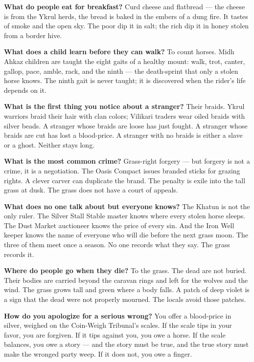 \vspace{1em}

\begin{almanac}
\textbf{What do people eat for breakfast?} Curd cheese and flatbread --- the cheese is from the Ykrul herds, the bread is baked in the embers of a dung fire. It tastes of smoke and the open sky. The poor dip it in salt; the rich dip it in honey stolen from a border hive.

\textbf{What does a child learn before they can walk?} To count horses. Midh Ahkaz children are taught the eight gaits of a healthy mount: walk, trot, canter, gallop, pace, amble, rack, and the ninth --- the death-sprint that only a stolen horse knows. The ninth gait is never taught; it is discovered when the rider's life depends on it.

\textbf{What is the first thing you notice about a stranger?} Their braids. Ykrul warriors braid their hair with clan colors; Vilikari traders wear oiled braids with silver beads. A stranger whose braids are loose has just fought. A stranger whose braids are cut has lost a blood-price. A stranger with no braids is either a slave or a ghost. Neither stays long.

\textbf{What is the most common crime?} Grass-right forgery --- but forgery is not a crime, it is a negotiation. The Oasis Compact issues branded sticks for grazing rights. A clever carver can duplicate the brand. The penalty is exile into the tall grass at dusk. The grass does not have a court of appeals.

\textbf{What does no one talk about but everyone knows?} The Khatun is not the only ruler. The Silver Stall Stable master knows where every stolen horse sleeps. The Dust Market auctioneer knows the price of every sin. And the Iron Well keeper knows the name of everyone who will die before the next grass moon. The three of them meet once a season. No one records what they say. The grass records it.

\textbf{Where do people go when they die?} To the grass. The dead are not buried. Their bodies are carried beyond the caravan rings and left for the wolves and the wind. The grass grows tall and green where a body falls. A patch of deep violet is a sign that the dead were not properly mourned. The locals avoid those patches.

\textbf{How do you apologize for a serious wrong?} You offer a blood-price in silver, weighed on the Coin-Weigh Tribunal's scales. If the scale tips in your favor, you are forgiven. If it tips against you, you owe a horse. If the scale balances, you owe a story --- and the story must be true, and the true story must make the wronged party weep. If it does not, you owe a finger.


\end{almanac}
